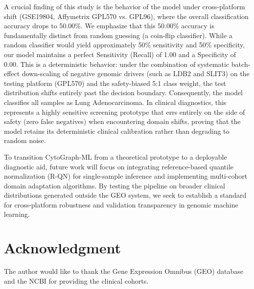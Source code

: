\documentclass[journal,10pt]{IEEEtran}
\begin{document}
A crucial finding of this study is the behavior of the model under cross-platform shift (GSE19804, Affymetrix GPL570 vs. GPL96), where the overall classification accuracy drops to 50.00\%. We emphasize that this 50.00\% accuracy is fundamentally distinct from random guessing (a coin-flip classifier). While a random classifier would yield approximately 50\% sensitivity and 50\% specificity, our model maintains a perfect Sensitivity (Recall) of 1.00 and a Specificity of 0.00. This is a deterministic behavior: under the combination of systematic batch-effect down-scaling of negative genomic drivers (such as LDB2 and SLIT3) on the testing platform (GPL570) and the safety-biased 5:1 class weight, the test distribution shifts entirely past the decision boundary. Consequently, the model classifies all samples as Lung Adenocarcinoma. In clinical diagnostics, this represents a highly sensitive screening prototype that errs entirely on the side of safety (zero false negatives) when encountering domain shifts, proving that the model retains its deterministic clinical calibration rather than degrading to random noise.

To transition CytoGraph-ML from a theoretical prototype to a deployable diagnostic aid, future work will focus on integrating reference-based quantile normalization (R-QN) for single-sample inference and implementing multi-cohort domain adaptation algorithms. By testing the pipeline on broader clinical distributions generated outside the GEO system, we seek to establish a standard for cross-platform robustness and validation transparency in genomic machine learning.

\section*{Acknowledgment}
The author would like to thank the Gene Expression Omnibus (GEO) database and the NCBI for providing the clinical cohorts.
\end{document}
